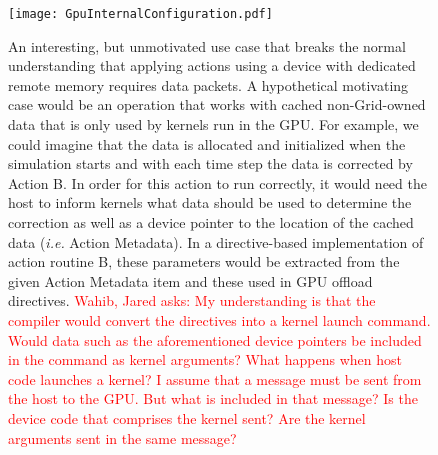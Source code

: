 \documentclass{article}
\newcommand{\ie}{\textit{i.e.}}   %
\newcommand{\WahibQfromJO}[1]   {\textcolor{red}{Wahib, Jared asks: #1}}
\begin{document}
\begin{appendices}
\begin{figure}[!hp]
\begin{center}
\texttt{[image: GpuInternalConfiguration.pdf]}
\caption[]{An interesting, but unmotivated use case that breaks the normal
understanding that applying actions using a device with dedicated remote memory
requires data packets.  A hypothetical motivating case would be an operation
that works with cached non-Grid-owned data that is only used by kernels run in
the GPU.  For example, we could imagine that the data is allocated and
initialized when the simulation starts and with each time step the data is
corrected by Action B.  In order for this action to run correctly, it would need
the host to inform kernels what data should be used to determine the
correction as well as a device pointer to the location of the cached data (\ie
Action Metadata).  In a directive-based implementation of action routine B, these
parameters would be extracted from the given Action Metadata item and these used
in GPU offload directives.  \WahibQfromJO{My understanding is that the compiler
would convert the directives into a kernel launch command.  Would data such as
the aforementioned device pointers be included in the command as kernel
arguments?  What happens when host code launches a kernel?  I assume that a
message must be sent from the host to the GPU.  But what is included in that
message?  Is the device code that comprises the kernel sent?  Are the kernel
arguments sent in the same message?}}
\label{fig:GpuInternalConfig}
\end{center}
\end{figure}


\end{appendices}
\end{document}
